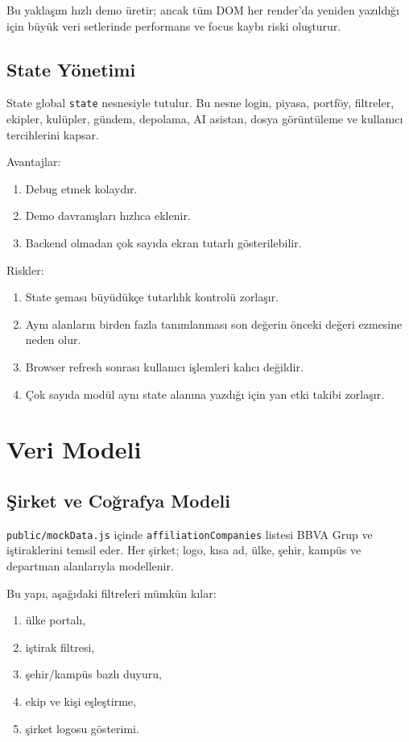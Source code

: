 \documentclass[11pt,a4paper]{article}
\newcommand{\code}[1]{\texttt{#1}}
\begin{document}
Bu yaklaşım hızlı demo üretir; ancak tüm DOM her render'da yeniden yazıldığı için büyük veri setlerinde performans ve focus kaybı riski oluşturur.

\subsection{State Yönetimi}

State global \code{state} nesnesiyle tutulur. Bu nesne login, piyasa, portföy, filtreler, ekipler, kulüpler, gündem, depolama, AI asistan, dosya görüntüleme ve kullanıcı tercihlerini kapsar.

Avantajlar:

\begin{enumerate}
  \item Debug etmek kolaydır.
  \item Demo davranışları hızlıca eklenir.
  \item Backend olmadan çok sayıda ekran tutarlı gösterilebilir.
\end{enumerate}

Riskler:

\begin{enumerate}
  \item State şeması büyüdükçe tutarlılık kontrolü zorlaşır.
  \item Aynı alanların birden fazla tanımlanması son değerin önceki değeri ezmesine neden olur.
  \item Browser refresh sonrası kullanıcı işlemleri kalıcı değildir.
  \item Çok sayıda modül aynı state alanına yazdığı için yan etki takibi zorlaşır.
\end{enumerate}

\section{Veri Modeli}

\subsection{Şirket ve Coğrafya Modeli}

\code{public/mockData.js} içinde \code{affiliationCompanies} listesi BBVA Grup ve iştiraklerini temsil eder. Her şirket; logo, kısa ad, ülke, şehir, kampüs ve departman alanlarıyla modellenir.

Bu yapı, aşağıdaki filtreleri mümkün kılar:

\begin{enumerate}
  \item ülke portalı,
  \item iştirak filtresi,
  \item şehir/kampüs bazlı duyuru,
  \item ekip ve kişi eşleştirme,
  \item şirket logosu gösterimi.
\end{enumerate}
\end{document}
